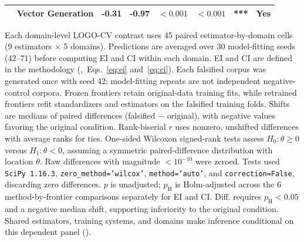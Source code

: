 \documentclass{article}
\begin{document}
\begin{table}[H]
\begin{tabularx}{\linewidth}{@{}l>{\raggedright\arraybackslash}Xrrrrrr@{}}
 & Vector Generation & -0.31 & -0.97 & $<0.001$ & $<0.001$ & *** & Yes \\
\bottomrule
\end{tabularx}
\par\vspace{12pt}
\begin{minipage}{\linewidth}
\footnotesize
Each domain-level LOGO-CV contrast uses 45 paired estimator-by-domain cells (9 estimators $\times$ 5 domains). Predictions are averaged over 30 model-fitting seeds (42--71) before computing EI and CI within each domain. EI and CI are defined in the methodology (,~Eqs.~\eqref{eq:ei} and~\eqref{eq:ci}). Each falsified corpus was generated once with seed 42; model-fitting repeats are not independent negative-control corpora. Frozen frontiers retain original-data training fits, while retrained frontiers refit standardizers and estimators on the falsified training folds. Shifts are medians of paired differences (falsified $-$ original), with negative values favoring the original condition. Rank-biserial $r$ uses nonzero, unshifted differences with average ranks for ties. One-sided Wilcoxon signed-rank tests assess $H_0:\theta\geq0$ versus $H_1:\theta<0$, assuming a symmetric paired-difference distribution with location $\theta$. Raw differences with magnitude $<10^{-10}$ were zeroed. Tests used \texttt{SciPy 1.16.3}, \texttt{zero\_method='wilcox'}, \texttt{method='auto'}, and \texttt{correction=False}, discarding zero differences. $p$ is unadjusted; $p_{\mathrm H}$ is Holm-adjusted across the 6 method-by-frontier comparisons separately for EI and CI. Diff. requires $p_{\mathrm H}<0.05$ and a negative median shift, supporting inferiority to the original condition. Shared estimators, training systems, and domains make inference conditional on this dependent panel ().
\end{minipage}
\end{table}
\end{document}
